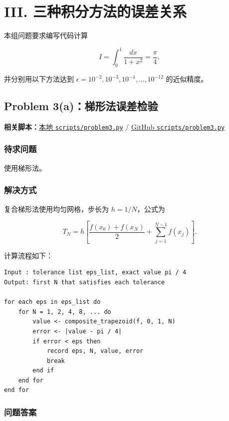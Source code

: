 \documentclass[12pt,a4paper,fontset=none]{ctexart}
\newcommand{\fileinline}[1]{{\urlstyle{same}\nolinkurl{#1}}}
\newcommand{\metadataline}[1]{#1}
\newcommand{\scriptpath}[1]{\fileinline{#1}}
\newcommand{\githubscriptsbase}{https://github.com/Void0312Aurora/computational-physics-homework-2026/blob/main/07/scripts}
\newcommand{\scriptlink}[1]{\noindent\metadataline{\textbf{相关脚本：}\href{../../../scripts/#1}{本地 \scriptpath{scripts/#1}} / \href{\githubscriptsbase/#1}{GitHub \scriptpath{scripts/#1}}}\par\medskip}
\begin{document}
\section*{III. 三种积分方法的误差关系}\label{iii.-ux4e09ux79cdux79efux5206ux65b9ux6cd5ux7684ux8befux5deeux5173ux7cfb}

本组问题要求编写代码计算

\[
I=\int_0^1\frac{dx}{1+x^2}=\frac{\pi}{4},
\]

并分别用以下方法达到 \(\epsilon=10^{-2},10^{-3},10^{-4},\ldots,10^{-12}\) 的近似精度。

\subsection{Problem 3(a)：梯形法误差检验}\label{problem-3a}

\scriptlink{problem3.py}

\subsubsection{待求问题}\label{ux5f85ux6c42ux95eeux9898-4}

使用梯形法。

\subsubsection{解决方式}\label{ux89e3ux51b3ux65b9ux5f0f-4}

复合梯形法使用均匀网格，步长为 \(h=1/N\)，公式为

\[
T_N=h\left[\frac{f(x_0)+f(x_N)}{2}+\sum_{j=1}^{N-1}f(x_j)\right].
\]

计算流程如下：

\begin{verbatim}
Input : tolerance list eps_list, exact value pi / 4
Output: first N that satisfies each tolerance

for each eps in eps_list do
    for N = 1, 2, 4, 8, ... do
        value <- composite_trapezoid(f, 0, 1, N)
        error <- |value - pi / 4|
        if error < eps then
            record eps, N, value, error
            break
        end if
    end for
end for
\end{verbatim}

\subsubsection{问题答案}\label{ux95eeux9898ux7b54ux6848-4}
\end{document}
